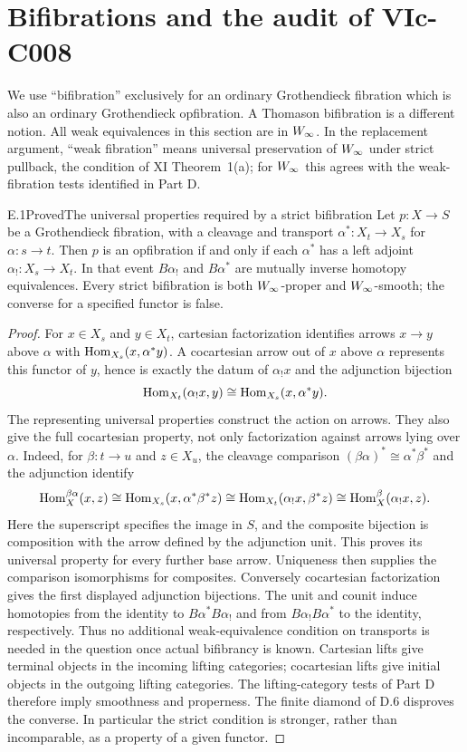 \section{Bifibrations and the audit of VIc-C008}

We use ``bifibration'' exclusively for an ordinary Grothendieck fibration which is also an ordinary Grothendieck opfibration. A Thomason bifibration is a different notion. All weak equivalences in this section are in $W_{\infty}$. In the replacement argument, ``weak fibration'' means universal preservation of $W_{\infty}$ under strict pullback, the condition of XI Theorem~1(a); for $W_{\infty}$ this agrees with the weak-fibration tests identified in Part D.

\begin{statement}{E.1}{Proved}{The universal properties required by a strict bifibration}
Let $p:X\to S$ be a Grothendieck fibration, with a cleavage and transport $\alpha^*:X_t\to X_s$ for $\alpha:s\to t$. Then $p$ is an opfibration if and only if each $\alpha^*$ has a left adjoint $\alpha_!:X_s\to X_t$. In that event $B\alpha_!$ and $B\alpha^*$ are mutually inverse homotopy equivalences. Every strict bifibration is both $W_{\infty}$-proper and $W_{\infty}$-smooth; the converse for a specified functor is false.
\end{statement}
\begin{proof}
For $x\in X_s$ and $y\in X_t$, cartesian factorization identifies arrows $x\to y$ above $\alpha$ with $\operatorname{Hom}_{X_s}(x,\alpha^*y)$. A cocartesian arrow out of $x$ above $\alpha$ represents this functor of $y$, hence is exactly the datum of $\alpha_!x$ and the adjunction bijection
\[
 \operatorname{Hom}_{X_t}(\alpha_!x,y)\cong\operatorname{Hom}_{X_s}(x,\alpha^*y).
\]
The representing universal properties construct the action on arrows.
They also give the full cocartesian property, not only factorization
against arrows lying over $\alpha$. Indeed, for $\beta:t\to u$ and
$z\in X_u$, the cleavage comparison
$(\beta\alpha)^*\cong\alpha^*\beta^*$ and the adjunction identify
\[
 \operatorname{Hom}^{\beta\alpha}_{X}(x,z)
 \cong \operatorname{Hom}_{X_s}(x,\alpha^*\beta^*z)
 \cong \operatorname{Hom}_{X_t}(\alpha_!x,\beta^*z)
 \cong \operatorname{Hom}^\beta_X(\alpha_!x,z).
\]
Here the superscript specifies the image in $S$, and the composite
bijection is composition with the arrow defined by the adjunction
unit. This proves its universal property for every further base arrow.
Uniqueness then supplies the comparison isomorphisms for composites.
Conversely cocartesian factorization gives the first displayed
adjunction bijections. The unit and counit induce homotopies from the
identity to $B\alpha^*B\alpha_!$ and from $B\alpha_!B\alpha^*$ to the
identity, respectively. Thus no additional weak-equivalence condition
on transports is needed in the question once actual bifibrancy is
known. Cartesian lifts give terminal objects in the incoming lifting
categories; cocartesian lifts give initial objects in the outgoing
lifting categories. The lifting-category tests of Part D therefore
imply smoothness and properness. The finite diamond of D.6 disproves
the converse. In particular the strict condition is stronger, rather
than incomparable, as a property of a given functor.
\end{proof}


